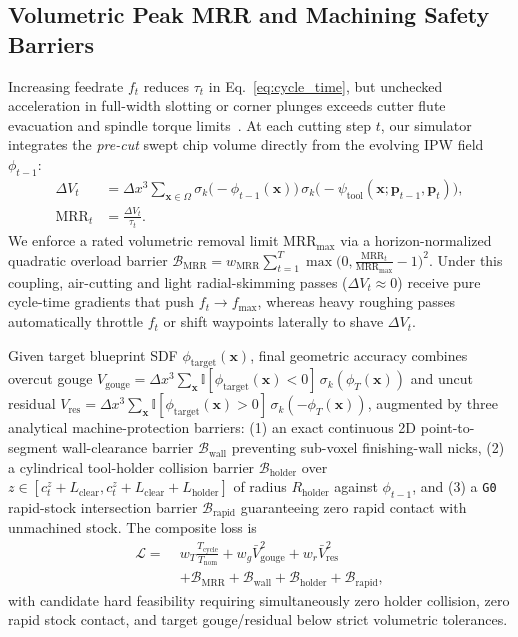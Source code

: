 \documentclass[conference]{IEEEtran}
\begin{document}
\subsection{Volumetric Peak MRR and Machining Safety Barriers}
Increasing feedrate $f_t$ reduces $\tau_t$ in Eq.~\eqref{eq:cycle_time}, but unchecked acceleration in full-width slotting or corner plunges exceeds cutter flute evacuation and spindle torque limits~\cite{altintas2012manufacturing}. At each cutting step $t$, our simulator integrates the \emph{pre-cut} swept chip volume directly from the evolving IPW field $\phi_{t-1}$:
\begin{equation}
  \begin{aligned}
    \Delta V_t &= \Delta x^3 \sum_{\mathbf{x} \in \Omega} \sigma_k\!\big(\!-\phi_{t-1}(\mathbf{x})\big)\,\sigma_k\!\big(\!-\psi_{\text{tool}}(\mathbf{x}; \mathbf{p}_{t-1}, \mathbf{p}_t)\big), \\
    \text{MRR}_t &= \frac{\Delta V_t}{\tau_t}.
  \end{aligned}
  \label{eq:mrr}
\end{equation}
We enforce a rated volumetric removal limit $\text{MRR}_{\max}$ via a horizon-normalized quadratic overload barrier $\mathcal{B}_{\text{MRR}} = w_{\text{MRR}} \sum_{t=1}^T \max\!\big(0, \frac{\text{MRR}_t}{\text{MRR}_{\max}} - 1\big)^2$. Under this coupling, air-cutting and light radial-skimming passes ($\Delta V_t \approx 0$) receive pure cycle-time gradients that push $f_t \to f_{\max}$, whereas heavy roughing passes automatically throttle $f_t$ or shift waypoints laterally to shave $\Delta V_t$.

Given target blueprint SDF $\phi_{\text{target}}(\mathbf{x})$, final geometric accuracy combines overcut gouge $V_{\text{gouge}} = \Delta x^3 \sum_{\mathbf{x}} \mathbb{I}[\phi_{\text{target}}(\mathbf{x}) < 0]\,\sigma_k(\phi_T(\mathbf{x}))$ and uncut residual $V_{\text{res}} = \Delta x^3 \sum_{\mathbf{x}} \mathbb{I}[\phi_{\text{target}}(\mathbf{x}) > 0]\,\sigma_k(-\phi_T(\mathbf{x}))$, augmented by three analytical machine-protection barriers: (1) an exact continuous 2D point-to-segment wall-clearance barrier $\mathcal{B}_{\text{wall}}$ preventing sub-voxel finishing-wall nicks, (2) a cylindrical tool-holder collision barrier $\mathcal{B}_{\text{holder}}$ over $z \in [c_t^z + L_{\text{clear}}, c_t^z + L_{\text{clear}} + L_{\text{holder}}]$ of radius $R_{\text{holder}}$ against $\phi_{t-1}$, and (3) a \texttt{G0} rapid-stock intersection barrier $\mathcal{B}_{\text{rapid}}$ guaranteeing zero rapid contact with unmachined stock. The composite loss is
\begin{equation}
  \begin{aligned}
    \mathcal{L} =\;& w_T \frac{T_{\text{cycle}}}{T_{\text{nom}}} + w_g \bar{V}_{\text{gouge}}^2 + w_r \bar{V}_{\text{res}}^2 \\
    &+ \mathcal{B}_{\text{MRR}} + \mathcal{B}_{\text{wall}} + \mathcal{B}_{\text{holder}} + \mathcal{B}_{\text{rapid}},
  \end{aligned}
  \label{eq:total_loss}
\end{equation}
with candidate hard feasibility requiring simultaneously zero holder collision, zero rapid stock contact, and target gouge/residual below strict volumetric tolerances.
\end{document}
